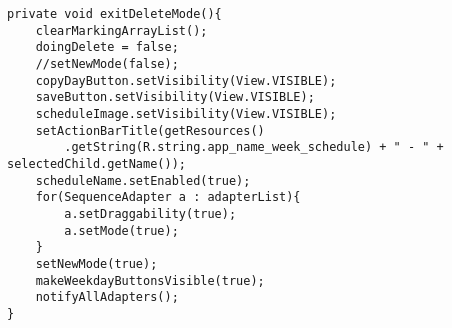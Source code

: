 \begin{lstlisting}[caption={The \texttt{exitDeleteMode()} function, which returns the application to the default mode}, label={lst:exitdeletemode}]
private void exitDeleteMode(){
    clearMarkingArrayList();
    doingDelete = false;
    //setNewMode(false);
    copyDayButton.setVisibility(View.VISIBLE);
    saveButton.setVisibility(View.VISIBLE);
    scheduleImage.setVisibility(View.VISIBLE);
    setActionBarTitle(getResources()
        .getString(R.string.app_name_week_schedule) + " - " + selectedChild.getName());
    scheduleName.setEnabled(true);
    for(SequenceAdapter a : adapterList){
        a.setDraggability(true);
        a.setMode(true);
    }
    setNewMode(true);
    makeWeekdayButtonsVisible(true);
    notifyAllAdapters();
}
\end{lstlisting}
